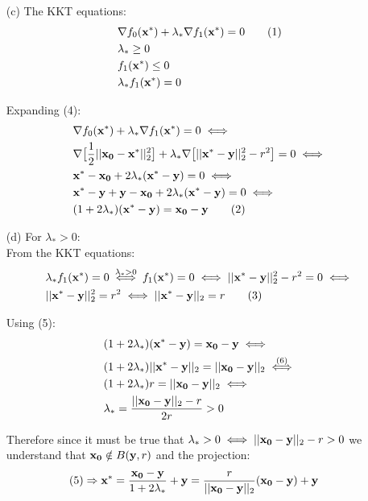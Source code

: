 \documentclass[12pt]{article}
\newcommand\numberthis{\addtocounter{equation}{1}\tag{\theequation}}
\begin{document}
\begin{enumerate}
\begin{enumerate}
			\item[(c)]
			The KKT equations:
			\begin{align*}
				&\nabla f_0({\bf x^*})+\lambda_*\nabla f_1({\bf x^*})=0 \numberthis \\
				&\lambda_*\geq0\\
				&f_1({\bf x^*})\leq 0\\
				&\lambda_*f_1({\bf x^*})=0
			\end{align*}
		
			Expanding (4):
			\begin{align*}
				&\nabla f_0({\bf x^*})+\lambda_*\nabla f_1({\bf x^*})=0 \iff\\
				&\nabla\big[\frac{1}{2}||{\bf x_0}-{\bf x^*}||_2^2\big]  +\lambda_*\nabla\big[||{\bf x^*}-{\bf y}||_2^2-r^2\big]=0 \iff \\
				&{\bf x^*}-{\bf x_0}+2\lambda_*({\bf x^*}-{\bf y})=0 \iff\\
				&{\bf x^*}-{\bf y}+{\bf y}-{\bf x_0}+2\lambda_*({\bf x^*}-{\bf y})=0 \iff\\
				&(1+2\lambda_*)({\bf x^*}-{\bf y}) ={\bf x_0}-{\bf y}\numberthis
			\end{align*}
		
			\item[(d)] 
			For $\lambda_*>0$:\\
			From the KKT equations: 
			\begin{align*}
				&\lambda_*f_1({\bf x^*})=0 \overset{\lambda_*>0}{\iff}f_1({\bf x^*})=0 \iff ||{\bf x^*}-{\bf y}||_2^2-r^2=0 \iff \\
				&||{\bf x^*}-{\bf y}||_2^2=r^2 \iff ||{\bf x^*}-{\bf y}||_2=r\numberthis
			\end{align*}
			
			Using (5):
			\begin{align*}
				&(1+2\lambda_*)({\bf x^*}-{\bf y}) ={\bf x_0}-{\bf y}\iff\\
				&(1+2\lambda_*)||{\bf x^*}-{\bf y}||_2 = ||{\bf x_0}-{\bf y}||_2\overset{(6)}{\iff}\\
				&(1+2\lambda_*)r=||{\bf x_0}-{\bf y}||_2\iff\\
				&\lambda_*=\frac{||{\bf x_0}-{\bf y}||_2-r}{2r}>0
			\end{align*}
			
			Therefore since it must be true that $\lambda_*>0 \iff ||{\bf x_0}-{\bf y}||_2-r>0$ we understand that ${\bf x_0}\notin B({\bf y},r)$ and the projection:
			\begin{align*}
				(5)\Rightarrow {\bf x^*}&=\frac{{\bf x_0}-{\bf y}}{1+2\lambda_*}+{\bf y}=\frac{r}{||{\bf x_0}-{\bf y}||_2}(\bf {x_0}-{\bf y})+{\bf y}
			\end{align*}
		

\end{enumerate}
\end{enumerate}
\end{document}
